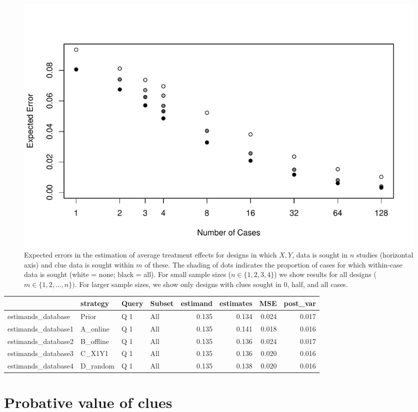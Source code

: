 \documentclass[
  12pt,
]{book}
\begin{document}
\begin{figure}[h!]
\centering
\includegraphics[width=\textwidth]{Figures/m_or_n.pdf}
\caption{{Expected errors in the estimation of average treatment effects for designs in which $X, Y$, data is sought in $n$ studies (horizontal axis) and clue data is sought within $m$ of these. The shading of dots indicates the proportion of cases for which within-case data is sought (white = none; black = all). For small sample sizes ($n \in \{1,2,3,4\}$) we show results for all designs ($m \in \{1,2,\dots, n\})$. For larger sample sizes, we show only designs with clues sought in 0, half, and all cases.}}
\label{morn}
\end{figure}

\begin{tabular}{l|l|l|l|r|r|r|r}
\hline
  & strategy & Query & Subset & estimand & estimates & MSE & post\_var\\
\hline
estimands\_database & Prior & Q 1 & All & 0.135 & 0.134 & 0.024 & 0.017\\
\hline
estimands\_database1 & A\_online & Q 1 & All & 0.135 & 0.141 & 0.018 & 0.016\\
\hline
estimands\_database2 & B\_offline & Q 1 & All & 0.135 & 0.136 & 0.024 & 0.017\\
\hline
estimands\_database3 & C\_X1Y1 & Q 1 & All & 0.135 & 0.136 & 0.020 & 0.016\\
\hline
estimands\_database4 & D\_random & Q 1 & All & 0.135 & 0.138 & 0.020 & 0.016\\
\hline
\end{tabular}

\hypertarget{probative-value-of-clues}{%
\section{Probative value of clues}\label{probative-value-of-clues}}
\end{document}
